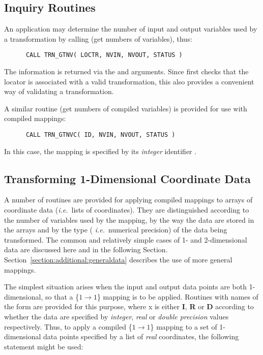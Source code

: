 \subsection{Inquiry Routines}

An application may determine the number of input and output variables
used by a transformation by calling  (get numbers of
variables), thus:

\begin{verbatim}
      CALL TRN_GTNV( LOCTR, NVIN, NVOUT, STATUS )
\end{verbatim}

The information is returned via the  and 
arguments. 
Since  first checks that the locator  is
associated with a valid transformation, this also provides a convenient way
of validating a transformation. 

A similar routine  (get numbers of compiled variables) is
provided for use with compiled mappings: 

\begin{verbatim}
      CALL TRN_GTNVC( ID, NVIN, NVOUT, STATUS )
\end{verbatim}

In this case, the mapping is specified by its {\em integer} identifier
. 


\subsection{Transforming 1-Dimensional Coordinate Data}

\label{section:simple:1ddata}

A number of routines are provided for applying compiled mappings to arrays
of coordinate data ({\em i.e.}\ lists of coordinates).
They are distinguished according to the number of variables used by the
mapping, by the way the data are stored in the arrays and by the type ({\em
i.e.}\ numerical precision) of the data being transformed. 
The common and relatively simple cases of 1- and 2-dimensional data are
discussed here and in the following Section. 
Section~\ref{section:additional:generaldata} describes the use of more
general mappings. 

The simplest situation arises when the input and output data points are both
1-dimensional, so that a \mbox{\{$1 \rightarrow 1$\}} mapping is to be
applied. 
Routines with names of the form  are provided for this
purpose, where x is either {\bf I}, {\bf R} or {\bf D} according to whether
the data are specified by {\em integer}, {\em real} or {\em double
precision} values respectively. 
Thus, to apply a compiled \mbox{\{$1 \rightarrow 1$\}} mapping to a set of
1-dimensional data points specified by a list of {\em real} coordinates, the
following statement might be used: 

